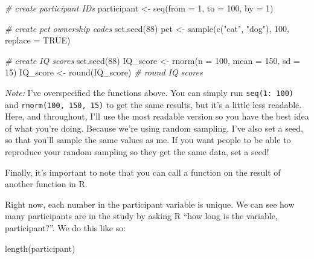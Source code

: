 \documentclass[
]{book}
\newenvironment{Shaded}{\begin{snugshade}}{\end{snugshade}}
\newcommand{\AttributeTok}[1]{\textcolor[rgb]{0.77,0.63,0.00}{#1}}
\newcommand{\CommentTok}[1]{\textcolor[rgb]{0.56,0.35,0.01}{\textit{#1}}}
\newcommand{\ConstantTok}[1]{\textcolor[rgb]{0.00,0.00,0.00}{#1}}
\newcommand{\DecValTok}[1]{\textcolor[rgb]{0.00,0.00,0.81}{#1}}
\newcommand{\FunctionTok}[1]{\textcolor[rgb]{0.00,0.00,0.00}{#1}}
\newcommand{\NormalTok}[1]{#1}
\newcommand{\OtherTok}[1]{\textcolor[rgb]{0.56,0.35,0.01}{#1}}
\newcommand{\StringTok}[1]{\textcolor[rgb]{0.31,0.60,0.02}{#1}}
\begin{document}
\begin{Shaded}
\begin{Highlighting}[]
\CommentTok{\# create participant IDs}
\NormalTok{participant }\OtherTok{\textless{}{-}} \FunctionTok{seq}\NormalTok{(}\AttributeTok{from =} \DecValTok{1}\NormalTok{, }\AttributeTok{to =} \DecValTok{100}\NormalTok{, }\AttributeTok{by =} \DecValTok{1}\NormalTok{)}

\CommentTok{\# create pet ownership codes}
\FunctionTok{set.seed}\NormalTok{(}\DecValTok{88}\NormalTok{)}
\NormalTok{pet }\OtherTok{\textless{}{-}} \FunctionTok{sample}\NormalTok{(}\FunctionTok{c}\NormalTok{(}\StringTok{"cat"}\NormalTok{, }\StringTok{"dog"}\NormalTok{), }\DecValTok{100}\NormalTok{, }\AttributeTok{replace =} \ConstantTok{TRUE}\NormalTok{)}

\CommentTok{\# create IQ scores}
\FunctionTok{set.seed}\NormalTok{(}\DecValTok{88}\NormalTok{)}
\NormalTok{IQ\_score }\OtherTok{\textless{}{-}} \FunctionTok{rnorm}\NormalTok{(}\AttributeTok{n =} \DecValTok{100}\NormalTok{, }\AttributeTok{mean =} \DecValTok{150}\NormalTok{, }\AttributeTok{sd =} \DecValTok{15}\NormalTok{)}
\NormalTok{IQ\_score }\OtherTok{\textless{}{-}} \FunctionTok{round}\NormalTok{(IQ\_score) }\CommentTok{\# round IQ scores}
\end{Highlighting}
\end{Shaded}

\emph{Note:} I've overspecified the functions above. You can simply run \texttt{seq(1:\ 100)} and \texttt{rnorm(100,\ 150,\ 15)} to get the same results, but it's a little less readable. Here, and throughout, I'll use the most readable version so you have the best idea of what you're doing. Because we're using random sampling, I've also set a seed, so that you'll sample the same values as me. If you want people to be able to reproduce your random sampling so they get the same data, set a seed!

Finally, it's important to note that you can call a function on the result of another function in R.

Right now, each number in the participant variable is unique. We can see how many participants are in the study by asking R ``how long is the variable, participant?''. We do this like so:

\begin{Shaded}
\begin{Highlighting}[]
\FunctionTok{length}\NormalTok{(participant)}
\end{Highlighting}
\end{Shaded}
\end{document}
